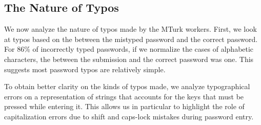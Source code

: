\subsection{The Nature of Typos} 

We now analyze the nature of typos made by the MTurk workers.  First, we look at
typos based on the \edistname between the mistyped password and the correct
password. For 86\% of incorrectly typed passwords, if we normalize the cases of
alphabetic characters, the \edistname between the submission and the correct
password was one.  This suggests most password typos are relatively simple.

To obtain better clarity on the kinds of typos made, we analyze 
typographical errors on a representation of strings 
that accounts for the keys that must be pressed while entering it. 
This allows us in particular to highlight the role of
capitalization errors due to shift and caps-lock mistakes during password entry. 

